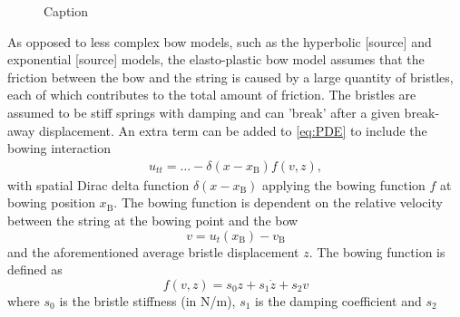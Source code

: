 \documentclass[twoside,a4paper]{article}
\begin{document}
\begin{figure}[h]
    \caption{Caption}
    \label{fig:my_label}
\end{figure}

As opposed to less complex bow models, such as the hyperbolic [source] and exponential [source] models, the elasto-plastic bow model assumes that the friction between the bow and the string is caused by a large quantity of bristles, each of which contributes to the total amount of friction. The bristles are assumed to be stiff springs with damping and can 'break' after a given break-away displacement. An extra term can be added to \eqref{eq:PDE} to include the bowing interaction
\begin{equation}
    \begin{aligned}
    \label{eq:bowingTerm}
        u_{tt} = \hdots - \delta(x-x_\text{B})f(v, z),
    \end{aligned}
\end{equation}
with spatial Dirac delta function $\delta(x-x_\text{B})$ applying the bowing function $f$ at bowing position $x_\text{B}$. The bowing function is dependent on the relative velocity between the string at the bowing point and the bow
\begin{equation}\label{eq:relVel}
  v = u_t(x_\text{B}) - v_\text{B}
\end{equation}
and the aforementioned average bristle displacement $z$. The bowing function is defined as
\begin{equation}\label{eq:forceFunction}
    f(v, z) = s_0z + s_1\dot z + s_2v
\end{equation}
where $s_0$ is the bristle stiffness (in N/m), $s_1$ is the damping coefficient and $s_2$ 
\end{document}
